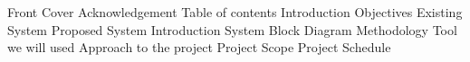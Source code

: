 Front Cover 
Acknowledgement 
Table of contents 
Introduction 
Objectives 
Existing System 
Proposed System
Introduction 
System Block Diagram 
Methodology
Tool we will used 
Approach to the project 
Project Scope 
Project Schedule 


